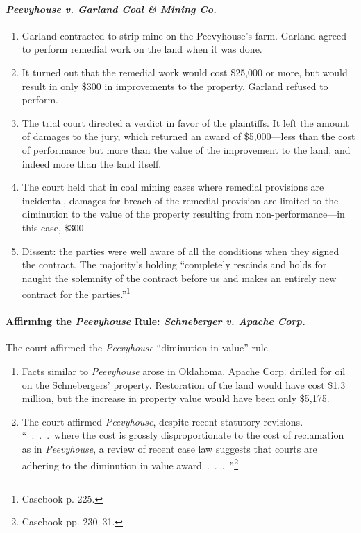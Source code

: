 \paragraph{\emph{Peevyhouse v. Garland Coal \& Mining Co.}}

\begin{enumerate}
    \item Garland contracted to strip mine on the Peevyhouse's farm. Garland 
    agreed to perform remedial work on the land when it was done.
    \item It turned out that the remedial work would cost \$25,000 or more, 
    but would result in only \$300 in improvements to the property. Garland 
    refused to perform.
    \item The trial court directed a verdict in favor of the plaintiffs. It 
    left the amount of damages to the jury, which returned an award of 
    \$5,000---less than the cost of performance but more than the value of the 
    improvement to the land, and indeed more than the land itself.
    \item The court held that in coal mining cases where remedial provisions 
    are incidental, damages for breach of the remedial provision are limited 
    to the diminution to the value of the property resulting from 
    non-performance---in this case, \$300.
    \item Dissent: the parties were well aware of all the conditions when they 
    signed the contract. The majority's holding ``completely rescinds and 
    holds for naught the solemnity of the contract before us and makes an 
    entirely new contract for the parties.''\footnote{Casebook p. 225.}
\end{enumerate}

\paragraph{Affirming the \emph{Peevyhouse} Rule: \emph{Schneberger v. Apache 
Corp.}}

The court affirmed the \emph{Peevyhouse} ``diminution in value'' rule.

\begin{enumerate}
    \item Facts similar to \emph{Peevyhouse} arose in Oklahoma. Apache Corp. 
    drilled for oil on the Schnebergers' property. Restoration of the land 
    would have cost \$1.3 million, but the increase in property value would 
    have been only \$5,175. 
    \item The court affirmed \emph{Peevyhouse}, despite recent statutory 
    revisions. ``~.~.~.~where the cost is grossly disproportionate to the cost 
    of reclamation as in \emph{Peevyhouse}, a review of recent case law 
    suggests that courts are adhering to the diminution in value 
    award~.~.~.~''\footnote{Casebook pp. 230--31.}
\end{enumerate}

